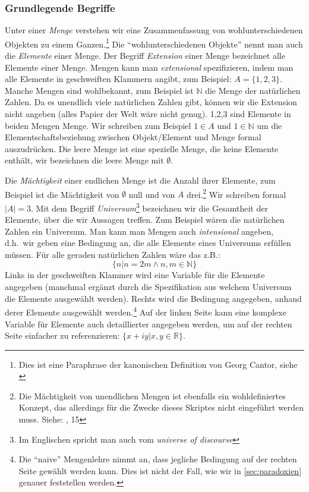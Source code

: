 \subsubsection{Grundlegende Begriffe}\label{grundmenge}
Unter einer \emph{Menge} verstehen wir eine Zusammenfassung von wohlunterschiedenen Objekten
zu einem Ganzen.\footnote{
    Dies ist eine Paraphrase der kanonischen Definition von Georg Cantor, siehe \cite{cantor}
}
Die ``wohlunterschiedenen Objekte'' nennt man auch die \emph{Elemente} einer Menge.
Der Begriff \emph{Extension} einer Menge bezeichnet alle Elemente einer Menge.
Mengen kann man \emph{extensional} spezifizieren,
indem man alle Elemente in geschweiften Klammern angibt,
zum Beispiel: $A = \{ 1,2,3 \}$.
Manche Mengen sind wohlbekannt,
zum Beispiel ist $\mathbb{N}$ die Menge der natürlichen Zahlen.
Da es unendlich viele natürlichen Zahlen gibt,
können wir die Extension nicht angeben
(alles Papier der Welt wäre nicht genug).
1,2,3 sind Elemente in beiden Mengen Menge.
Wir schreiben zum Beispiel $1 \in A$ und $1 \in \mathbb{N}$
um die Elementschaftsbeziehung zwischen Objekt/Element und Menge formal auszudrücken.
Die leere Menge ist eine spezielle Menge, die keine Elemente enthält,
wir bezeichnen die leere Menge mit $\emptyset$.

Die \emph{Mächtigkeit} einer endlichen Menge ist die Anzahl ihrer Elemente,
zum Beispiel ist die Mächtigkeit von $\emptyset$ null und von $A$ drei.\footnote{
    Die Mächtigkeit von unendlichen Mengen ist ebenfalls ein wohldefiniertes Konzept,
    das allerdings für die Zwecke dieses Skriptes nicht eingeführt werden muss.
    Siehe: \cite{link}, 15
}
Wir schreiben formal $|A| = 3$.
Mit dem Begriff \emph{Universum}\footnote{
    Im Englischen spricht man auch vom \emph{universe of discourse}
} bezeichnen wir die Gesamtheit der Elemente,
über die wir Aussagen treffen.
Zum Beispiel wären die natürlichen Zahlen ein Universum.
Man kann man Mengen auch \emph{intensional} angeben,
d.h.\ wir geben eine Bedingung an,
die alle Elemente eines Universums erfüllen müssen.
Für alle geraden natürlichen Zahlen wäre das z.B.:
\[\{n| n = 2m \wedge n,m \in \mathbb{N} \}\]
Links in der geschweiften Klammer wird eine Variable für die Elemente angegeben
(manchmal ergänzt durch die Spezifikation aus welchem Universum die Elemente ausgewählt werden).
Rechts wird die Bedingung angegeben, anhand derer Elemente ausgewählt werden.\footnote{
    Die ``naive'' Mengenlehre nimmt an,
    dass jegliche Bedingung auf der rechten Seite gewählt werden kann.
    Dies ist nicht der Fall, wie wir in \autoref{sec:paradoxien} genauer feststellen werden.
}
Auf der linken Seite kann eine komplexe Variable für Elemente auch detaillierter angegeben werden,
um auf der rechten Seite einfacher zu referenzieren:
$\{x + iy| x,y \in \mathbb{R}\}$.

